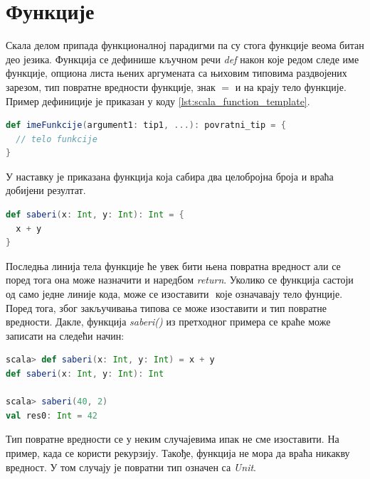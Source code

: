 \documentclass[12pt,oneside]{memoir}
\begin{document}
\section{Функције}
\label{sec:scala_funk}

Скала делом припада функционалној парадигми па су стога функције веома битан део језика. Функција се дефинише кључном речи \textit{def} након које редом следе име функције, опциона листа њених аргумената са њиховим типовима раздвојених зарезом, тип повратне вредности функције, знак $=$ и на крају тело функције. Пример дефиниције је приказан у коду \ref{lst:scala_function_template}.

\begin{lstlisting}[language=Scala, caption={Дефиниција фунције у скали}, label={lst:scala_function_template}]
def imeFunkcije(argument1: tip1, ...): povratni_tip = {
  // telo funkcije
}

\end{lstlisting}

У наставку је приказана функција која сабира два целобројна броја и враћа добијени резултат. 

\begin{lstlisting}[language=Scala, caption={Пример функције}, label={lst:scala_function_add_example}]
def saberi(x: Int, y: Int): Int = {
  x + y
}
\end{lstlisting}

Последња линија тела функције ће увек бити њена повратна вредност али се поред тога она може назначити и наредбом \textit{return}. Уколико се функција састоји од само једне линије кода, може се изоставити ${ }$ које означавају тело фунције. Поред тога, због закључивања типова се може изоставити и тип повратне вредности. Дакле, функција \textit{saberi()} из претходног примера се краће може записати на следећи начин:

\begin{lstlisting}[language=Scala, caption={Краћи запис функције saberi()}, label={lst:scala_function_add_example_simplified}]
scala> def saberi(x: Int, y: Int) = x + y
def saberi(x: Int, y: Int): Int

scala> saberi(40, 2)
val res0: Int = 42
\end{lstlisting}

Тип повратне вредности се у неким случајевима ипак не сме изоставити. На пример, када се користи рекурзију. Такође, функција не мора да враћа никакву вредност. У том случају је повратни тип означен са \textit{Unit}. \cite{scala_prog}
\end{document}
